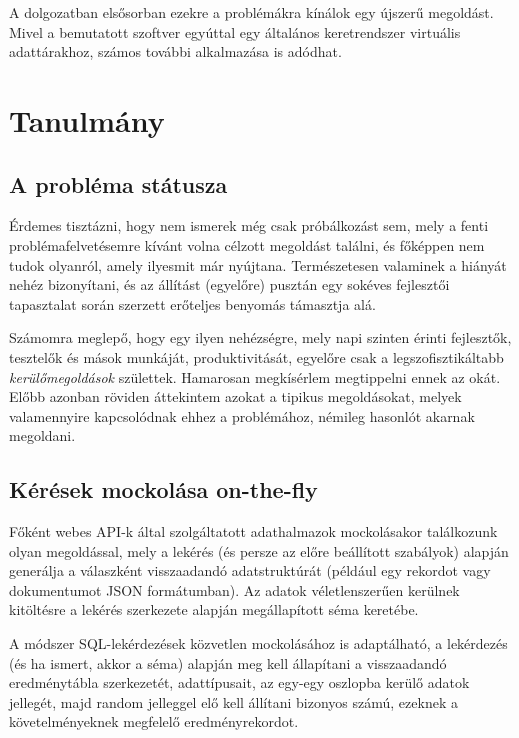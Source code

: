 \documentclass[
    parspace,
    noindent,
    nohyp,
]{elteiktdk}[2023/04/10]
\newcommand{\todoref}[1]{\todo[inline, noinlinepar, color=red, textcolor=white, inlinewidth=0.6cm, caption={#1}]{\large \textbf{×}}}
\begin{document}
A dolgozatban elsősorban ezekre a problémákra kínálok egy újszerű megoldást.
Mivel a bemutatott szoftver egyúttal egy általános keretrendszer virtuális adattárakhoz,
számos további alkalmazása is adódhat.

\section{Tanulmány}

\subsection{A probléma státusza}

Érdemes tisztázni, hogy nem ismerek még csak próbálkozást sem,
mely a fenti problémafelvetésemre kívánt volna célzott megoldást találni,
és főképpen nem tudok olyanról, amely ilyesmit már nyújtana.
Természetesen valaminek a hiányát nehéz bizonyítani,
és az állítást (egyelőre) pusztán egy sokéves fejlesztői tapasztalat
során szerzett erőteljes benyomás támasztja alá.

Számomra meglepő, hogy egy ilyen nehézségre,
mely napi szinten érinti fejlesztők, tesztelők és mások munkáját, produktivitását,
egyelőre csak a legszofisztikáltabb \textit{kerülőmegoldások} születtek.
Hamarosan megkísérlem megtippelni ennek az okát.
Előbb azonban röviden áttekintem azokat a tipikus megoldásokat,
melyek valamennyire kapcsolódnak ehhez a problémához,
némileg hasonlót akarnak megoldani.

\subsection{Kérések mockolása on-the-fly}

Főként webes API-k által szolgáltatott adathalmazok mockolásakor találkozunk olyan megoldással,
mely a lekérés (és persze az előre beállított szabályok)
alapján generálja a válaszként visszaadandó adatstruktúrát
(például egy rekordot vagy dokumentumot JSON formátumban).
Az adatok véletlenszerűen kerülnek kitöltésre a lekérés szerkezete alapján megállapított séma keretébe.
\todoref{+CITE: API-mockolók}

A módszer SQL-lekérdezések közvetlen mockolásához is adaptálható,
a lekérdezés (és ha ismert, akkor a séma) alapján meg kell állapítani
a visszaadandó eredménytábla szerkezetét, adattípusait,
az egy-egy oszlopba kerülő adatok jellegét,
majd random jelleggel elő kell állítani bizonyos számú, ezeknek a követelményeknek megfelelő eredményrekordot.
\todoref{+CITE: SQL-mockolók}
\end{document}
